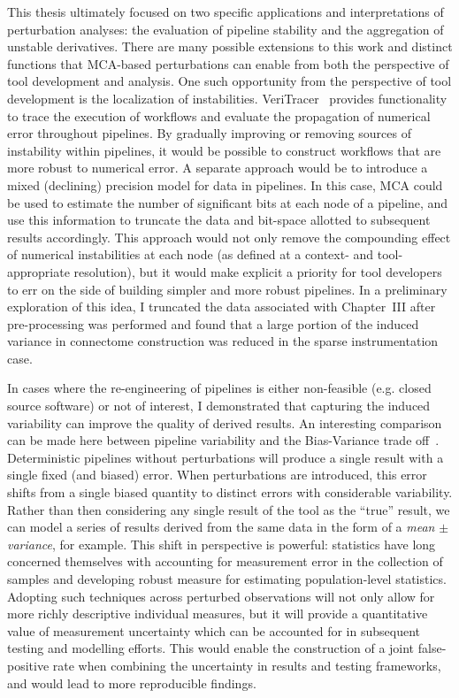 This thesis ultimately focused on two specific applications and interpretations of perturbation analyses: the
evaluation of pipeline stability and the aggregation of unstable derivatives. There are many possible extensions to
this work and distinct functions that MCA-based perturbations can enable from both the perspective of tool
development and analysis. One such opportunity from the perspective of tool development is the localization of
instabilities. VeriTracer~\cite{chatelain2018veritracer} provides functionality to trace the execution of
workflows and evaluate the propagation of numerical error throughout pipelines. By gradually improving or
removing sources of instability within pipelines, it would be possible to construct workflows that are more
robust to numerical error. A separate approach would be to introduce a mixed (declining) precision model for
data in pipelines. In this case, MCA could be used to estimate the number of significant bits at each node of
a pipeline, and use this information to truncate the data and bit-space allotted to subsequent results accordingly.
This approach would not only remove the compounding effect of numerical instabilities at each node (as defined at a
context- and tool-appropriate resolution), but it would make explicit a priority for tool developers to err on
the side of building simpler and more robust pipelines. In a preliminary exploration of this idea, I truncated the
data associated with Chapter~III after pre-processing was performed and found that a large portion of the induced
variance in connectome construction was reduced in the sparse instrumentation case.

In cases where the re-engineering of pipelines is either non-feasible (e.g. closed source software) or not of
interest, I demonstrated that capturing the induced variability can improve the quality of derived results. An
interesting comparison can be made here between pipeline variability and the Bias-Variance trade
off~\cite{jain2000statistical}. Deterministic pipelines without perturbations will produce a single result with a
single fixed (and biased) error. When perturbations are introduced, this error shifts from a single biased quantity
to distinct errors with considerable variability. Rather than then considering any single result of the tool as the
``true'' result, we can model a series of results derived from the same data in the form of a \textit{mean} $\pm$
\textit{variance}, for example. This shift in perspective is powerful: statistics have long concerned themselves
with accounting for measurement error in the collection of samples and developing robust measure for estimating
population-level statistics. Adopting such techniques across perturbed observations will not only allow for more
richly descriptive individual measures, but it will provide a quantitative value of measurement uncertainty which
can be accounted for in subsequent testing and modelling efforts. This would enable the construction of a joint
false-positive rate when combining the uncertainty in results and testing frameworks, and would lead to more
reproducible findings.

